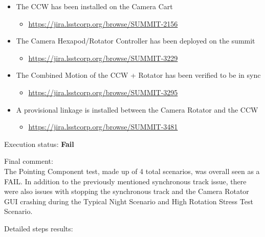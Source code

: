 \documentclass[SE,STR,toc]{lsstdoc}
\providecommand{\tightlist}{
  \setlength{\itemsep}{0pt}\setlength{\parskip}{0pt}}
\begin{document}
\begin{itemize}
\tightlist
\item
  The CCW has been installed on the Camera Cart

  \begin{itemize}
  \tightlist
  \item
    \url{https://jira.lsstcorp.org/browse/SUMMIT-2156}
  \end{itemize}
\item
  The Camera Hexapod/Rotator Controller has been deployed on the summit

  \begin{itemize}
  \tightlist
  \item
    \url{https://jira.lsstcorp.org/browse/SUMMIT-3229}
  \end{itemize}
\item
  The Combined Motion of the CCW + Rotator has been verified to be in
  sync

  \begin{itemize}
  \tightlist
  \item
    \url{https://jira.lsstcorp.org/browse/SUMMIT-3295}
  \end{itemize}
\item
  A provisional linkage is installed between the Camera Rotator and the
  CCW

  \begin{itemize}
  \tightlist
  \item
    \url{https://jira.lsstcorp.org/browse/SUMMIT-3481}
  \end{itemize}
\end{itemize}


Execution status: {\bf Fail }

Final comment:\\ The Pointing Component test, made up of 4 total scenarios, was overall
seen as a FAIL. In addition to the previously mentioned synchronous
track issue, there were also issues with stopping the synchronous track
and the Camera Rotator GUI crashing during the Typical Night Scenario
and High Rotation Stress Test Scenario.



Detailed steps results:
\end{document}
